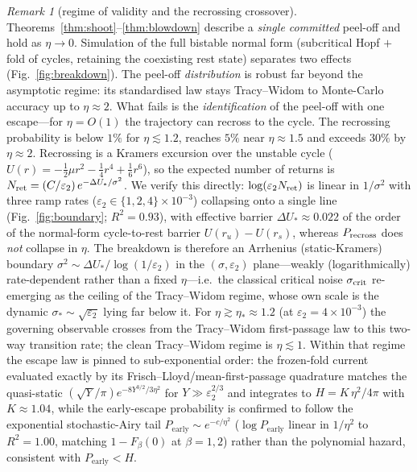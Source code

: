 \documentclass[11pt,reqno]{amsart}
\theoremstyle{plain}
\theoremstyle{definition}
\theoremstyle{remark}
\newtheorem{remark}[theorem]{Remark}
\newcommand{\Pearly}{P_{\mathrm{early}}}
\newcommand{\ep}{\varepsilon}
\begin{document}
\begin{remark}[regime of validity and the recrossing crossover]\label{rem:regime}
Theorems~\ref{thm:shoot}--\ref{thm:blowdown} describe a \emph{single committed} peel-off and
hold as $\eta\to0$. Simulation of the full bistable normal form (subcritical Hopf $+$ fold of
cycles, retaining the coexisting rest state) separates two effects (Fig.~\ref{fig:breakdown}).
The peel-off \emph{distribution} is robust far beyond the asymptotic regime: its standardised
law stays Tracy--Widom to Monte-Carlo accuracy up to $\eta\approx2$. What fails is the
\emph{identification} of the peel-off with one escape---for $\eta=O(1)$ the trajectory can
recross to the cycle. The recrossing probability is below $1\%$ for $\eta\lesssim1.2$, reaches
$5\%$ near $\eta\approx1.5$ and exceeds $30\%$ by $\eta\approx2$. Recrossing is a Kramers
excursion over the unstable cycle ($U(r)=-\tfrac12\mu r^2-\tfrac14 r^4+\tfrac16 r^6$), so the
expected number of returns is $N_{\rm ret}=(C/\ep_2)\,e^{-\Delta U_*/\sigma^2}$. We verify this
directly: $\log(\ep_2 N_{\rm ret})$ is linear in $1/\sigma^2$ with three ramp rates
($\ep_2\in\{1,2,4\}\times10^{-3}$) collapsing onto a single line (Fig.~\ref{fig:boundary};
$R^2=0.93$), with effective barrier $\Delta U_*\approx0.022$ of the order of the normal-form
cycle-to-rest barrier $U(r_u)-U(r_s)$, whereas $P_{\rm recross}$ does \emph{not} collapse in
$\eta$. The breakdown is therefore an Arrhenius (static-Kramers) boundary
$\sigma^2\sim\Delta U_*/\log(1/\ep_2)$ in the $(\sigma,\ep_2)$ plane---weakly (logarithmically)
rate-dependent rather than a fixed $\eta$---i.e.\ the classical critical noise
$\sigma_{\rm crit}$ re-emerging as the ceiling of the Tracy--Widom regime, whose own scale is
the dynamic $\sigma_*\sim\sqrt{\ep_2}$ lying far below it. For $\eta\gtrsim\eta_*\approx1.2$
(at $\ep_2=4\times10^{-3}$) the governing observable crosses from the Tracy--Widom
first-passage law to this two-way transition rate; the clean Tracy--Widom regime is
$\eta\lesssim1$. Within that regime the escape law is pinned to sub-exponential order: the
frozen-fold current evaluated exactly by its Frisch--Lloyd/mean-first-passage quadrature
matches the quasi-static $(\sqrt Y/\pi)e^{-8Y^{3/2}/3\eta^2}$ for $Y\gg\ep_2^{2/3}$ and
integrates to $H=K\,\eta^2/4\pi$ with $K\approx1.04$, while the early-escape probability is
confirmed to follow the exponential stochastic-Airy tail $\Pearly\sim e^{-c/\eta^2}$
($\log\Pearly$ linear in $1/\eta^2$ to $R^2=1.00$, matching $1-F_\beta(0)$ at $\beta=1,2$)
rather than the polynomial hazard, consistent with $\Pearly<H$.
\end{remark}
\end{document}
